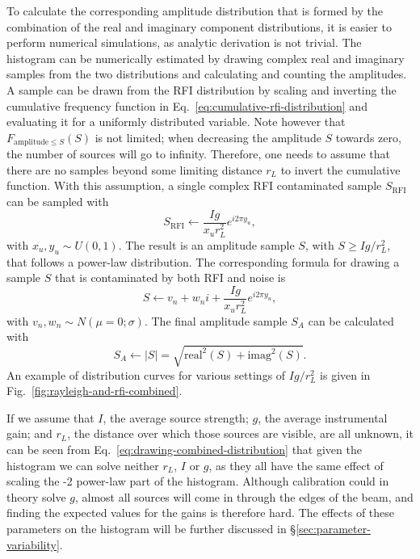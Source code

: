 \documentclass[useAMS,usenatbib]{mn2e}
\begin{document}
To calculate the corresponding amplitude distribution that is formed by the combination of the real and imaginary component distributions, it is easier to perform numerical simulations, as analytic derivation is not trivial. The histogram can be numerically estimated by drawing complex real and imaginary samples from the two distributions and calculating and counting the amplitudes. A sample can be drawn from the RFI distribution by scaling and inverting the cumulative frequency function in Eq.~\eqref{eq:cumulative-rfi-distribution} and evaluating it for a uniformly distributed variable. Note however that $F_{\textrm{amplitude}\le S}(S)$ is not limited; when decreasing the amplitude $S$ towards zero, the number of sources will go to infinity. Therefore, one needs to assume that there are no samples beyond some limiting distance $r_L$ to invert the cumulative function. With this assumption, a single complex RFI contaminated sample $S_{\textrm{RFI}}$ can be sampled with
\begin{equation} \label{eq:drawing-rfi-distribution}
S_{\textrm{RFI}} \leftarrow \frac{Ig}{x_u r_L^2} e^{i 2 \pi y_u},
\end{equation}
with $x_u, y_u \sim U(0, 1)$. The result is an amplitude sample $S$, with $S \ge Ig/r_L^2$, that follows a power-law distribution. The corresponding formula for drawing a sample $S$ that is contaminated by both RFI and noise is
\begin{equation} \label{eq:drawing-combined-distribution}
S \leftarrow v_n + w_n i + \frac{Ig}{x_u r_L^2} e^{i 2 \pi y_u},
\end{equation}
with $v_n, w_n \sim N(\mu=0; \sigma)$. The final amplitude sample $S_A$ can be calculated with 
\begin{equation} \label{eq:drawing-amplitudes}
S_A \leftarrow |S| = \sqrt{\textrm{real}^2({S})+\textrm{imag}^2({S})}.
\end{equation}
An example of distribution curves for various settings of $Ig/r_L^2$ is given in Fig.~\ref{fig:rayleigh-and-rfi-combined}.

If we assume that $I$, the average source strength; $g$, the average instrumental gain; and $r_L$, the distance over which those sources are visible, are all unknown, it can be seen from Eq.~\eqref{eq:drawing-combined-distribution} that given the histogram we can solve neither $r_L$, $I$ or $g$, as they all have the same effect of scaling the -2 power-law part of the histogram. Although calibration could in theory solve $g$, almost all sources will come in through the edges of the beam, and finding the expected values for the gains is therefore hard. The effects of these parameters on the histogram will be further discussed in \S\ref{sec:parameter-variability}.
\end{document}
